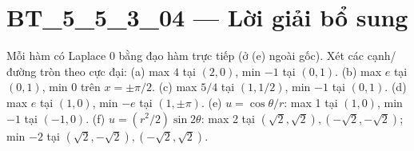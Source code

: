 \documentclass[10pt,a4paper]{article}
\begin{document}
\section*{BT\_5\_5\_3\_04 — Lời giải bổ sung}
Mỗi hàm có Laplace 0 bằng đạo hàm trực tiếp (ở (e) ngoài gốc). Xét các cạnh/đường tròn theo cực đại:
(a) max $4$ tại $(2,0)$, min $-1$ tại $(0,1)$.
(b) max $e$ tại $(0,1)$, min 0 trên $x=\pm\pi/2$.
(c) max $5/4$ tại $(1,1/2)$, min $-1$ tại $(0,1)$.
(d) max $e$ tại $(1,0)$, min $-e$ tại $(1,\pm\pi)$.
(e) $u=\cos\theta/r$: max 1 tại $(1,0)$, min $-1$ tại $(-1,0)$.
(f) $u=(r^2/2)\sin2\theta$: max 2 tại $(\sqrt2,\sqrt2),(-\sqrt2,-\sqrt2)$; min $-2$ tại $(\sqrt2,-\sqrt2),(-\sqrt2,\sqrt2)$.
\end{document}
